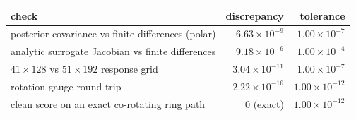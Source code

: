 \begin{tabular}{@{}lrr@{}}
\toprule
check & discrepancy & tolerance \\
\midrule
posterior covariance vs finite differences (polar) & $6.63\times10^{-9}$ & $1.00\times10^{-7}$ \\
analytic surrogate Jacobian vs finite differences & $9.18\times10^{-6}$ & $1.00\times10^{-4}$ \\
$41\times128$ vs $51\times192$ response grid & $3.04\times10^{-11}$ & $1.00\times10^{-7}$ \\
rotation gauge round trip & $2.22\times10^{-16}$ & $1.00\times10^{-12}$ \\
clean score on an exact co-rotating ring path & $0$ (exact) & $1.00\times10^{-12}$ \\
\bottomrule
\end{tabular}
